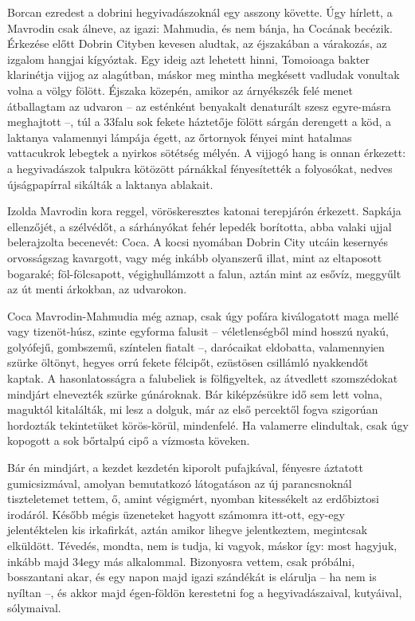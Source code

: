 \documentclass{IEEEtran}
\begin{document}
Borcan ezredest a dobrini hegyivadászoknál egy asszony követte. Úgy hírlett, a
Mavrodin csak álneve, az igazi: Mahmudia, és nem bánja, ha Cocának becézik.
Érkezése előtt Dobrin Cityben kevesen aludtak, az éjszakában a várakozás, az
izgalom hangjai kígyóztak. Egy ideig azt lehetett hinni, Tomoioaga bakter
klarinétja vijjog az alagútban, máskor meg mintha megkésett vadludak vonultak
volna a völgy fölött. Éjszaka közepén, amikor az árnyékszék felé menet
átballagtam az udvaron – az esténként benyakalt denaturált szesz egyre-másra
meghajtott –, túl a 33falu sok fekete háztetője fölött sárgán derengett a köd,
a laktanya valamennyi lámpája égett, az őrtornyok fényei mint hatalmas
vattacukrok lebegtek a nyirkos sötétség mélyén. A vijjogó hang is onnan
érkezett: a hegyivadászok talpukra kötözött párnákkal fényesítették a
folyosókat, nedves újságpapírral sikálták a laktanya ablakait.

Izolda Mavrodin kora reggel, vöröskeresztes katonai terepjárón érkezett.
Sapkája ellenzőjét, a szélvédőt, a sárhányókat fehér lepedék borította, abba
valaki ujjal belerajzolta becenevét: Coca. A kocsi nyomában Dobrin City utcáin
kesernyés orvosságszag kavargott, vagy még inkább olyanszerű illat, mint az
eltaposott bogaraké; föl-fölcsapott, végighullámzott a falun, aztán mint az
esővíz, meggyűlt az út menti árkokban, az udvarokon.

Coca Mavrodin-Mahmudia még aznap, csak úgy pofára kiválogatott maga mellé vagy
tizenöt-húsz, szinte egyforma falusit – véletlenségből mind hosszú nyakú,
golyófejű, gombszemű, színtelen fiatalt –, darócaikat eldobatta, valamennyien
szürke öltönyt, hegyes orrú fekete félcipőt, ezüstösen csillámló nyakkendőt
kaptak. A hasonlatosságra a falubeliek is fölfigyeltek, az átvedlett
szomszédokat mindjárt elnevezték szürke gúnároknak. Bár kiképzésükre idő sem
lett volna, maguktól kitalálták, mi lesz a dolguk, már az első percektől fogva
szigorúan hordozták tekintetüket körös-körül, mindenfelé. Ha valamerre
elindultak, csak úgy kopogott a sok bőrtalpú cipő a vízmosta köveken.

Bár én mindjárt, a kezdet kezdetén kiporolt pufajkával, fényesre áztatott
gumicsizmával, amolyan bemutatkozó látogatáson az új parancsnoknál
tiszteletemet tettem, ő, amint végigmért, nyomban kitessékelt az erdőbiztosi
irodáról. Később mégis üzeneteket hagyott számomra itt-ott, egy-egy
jelentéktelen kis irkafirkát, aztán amikor lihegve jelentkeztem, megintcsak
elküldött. Tévedés, mondta, nem is tudja, ki vagyok, máskor így: most hagyjuk,
inkább majd 34egy más alkalommal. Bizonyosra vettem, csak próbálni,
bosszantani akar, és egy napon majd igazi szándékát is elárulja – ha nem is
nyíltan –, és akkor majd égen-földön kerestetni fog a hegyivadászaival,
kutyáival, sólymaival.
\end{document}
